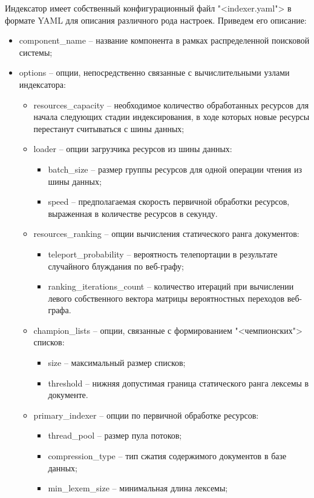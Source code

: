 Индексатор имеет собственный конфигурационный файл "<indexer.yaml"> в формате YAML для описания различного рода настроек. Приведем его описание:
\begin{itemize}
\item component\_name -- название компонента в рамках распределенной поисковой системы;
\item options -- опции, непосредственно связанные с вычислительными узлами индексатора:
\begin{itemize}
\item resources\_capacity -- необходимое количество обработанных ресурсов для начала следующих стадии индексирования, в ходе которых новые ресурсы перестанут считываться с шины данных;
\item loader -- опции загрузчика ресурсов из шины данных:
\begin{itemize}
\item batch\_size -- размер группы ресурсов для одной операции чтения из шины данных;
\item speed -- предполагаемая скорость первичной обработки ресурсов, выраженная в количестве ресурсов в секунду.
\end{itemize}
\item resources\_ranking -- опции вычисления статического ранга документов:
\begin{itemize}
\item teleport\_probability -- вероятность телепортации в результате случайного блуждания по веб-графу;
\item ranking\_iterations\_count -- количество итераций при вычислении левого собственного вектора матрицы вероятностных переходов веб-графа.
\end{itemize}
\item champion\_lists -- опции, связанные с формированием "<чемпионских"> списков:
\begin{itemize}
\item size -- максимальный размер списков;
\item threshold -- нижняя допустимая граница статического ранга лексемы в документе.
\end{itemize}
\item primary\_indexer -- опции по первичной обработке ресурсов:
\begin{itemize}
\item thread\_pool -- размер пула потоков;
\item compression\_type -- тип сжатия содержимого документов в базе данных;
\item min\_lexem\_size -- минимальная длина лексемы;

\end{itemize}
\end{itemize}
\end{itemize}
